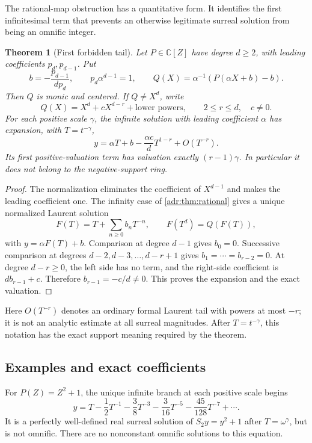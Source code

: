 \documentclass[11pt,letterpaper]{article}
\numberwithin{equation}{section}
\newtheorem{theorem}{Theorem}[section]
\theoremstyle{definition}
\theoremstyle{remark}
\newcommand{\C}{\mathbb C}
\begin{document}
The rational-map obstruction has a quantitative form. It identifies the
first infinitesimal term that prevents an otherwise legitimate surreal
solution from being an omnific integer.

\begin{theorem}[First forbidden tail]\label{adr:thm:tail}
Let $P\in\C[Z]$ have degree $d\ge2$, with leading coefficients
$p_d,p_{d-1}$. Put
\[
 b=-\frac{p_{d-1}}{d p_d},\qquad
 p_d\alpha^{d-1}=1,
 \qquad Q(X)=\alpha^{-1}(P(\alpha X+b)-b).
\]
Then $Q$ is monic and centered. If $Q\ne X^d$, write
\[
 Q(X)=X^d+cX^{d-r}+\text{lower powers},
 \qquad 2\le r\le d,\quad c\ne0.
\]
For each positive scale $\gamma$, the infinite solution with leading
coefficient $\alpha$ has expansion, with $T=t^{-\gamma}$,
\begin{equation}\label{adr:eq:tail}
 y=\alpha T+b-\frac{\alpha c}{d}T^{1-r}+O(T^{-r}).
\end{equation}
Its first positive-valuation term has valuation exactly $(r-1)\gamma$.
In particular it does not belong to the negative-support ring.
\end{theorem}
\begin{proof}
The normalization eliminates the coefficient of $X^{d-1}$ and makes the
leading coefficient one. The infinity case of \cref{adr:thm:rational}
gives a unique normalized Laurent solution
\[
 F(T)=T+\sum_{n\ge0}b_nT^{-n},\qquad F(T^d)=Q(F(T)),
\]
with $y=\alpha F(T)+b$. Comparison at degree $d-1$ gives $b_0=0$.
Successive comparison at degrees $d-2,d-3,\ldots,d-r+1$ gives
$b_1=\cdots=b_{r-2}=0$. At degree $d-r\ge0$, the left side has no
term, and the right-side coefficient is $d b_{r-1}+c$. Therefore
$b_{r-1}=-c/d\ne0$. This proves the expansion and the exact valuation.
\end{proof}

Here $O(T^{-r})$ denotes an ordinary formal Laurent tail with powers at
most $-r$; it is not an analytic estimate at all surreal magnitudes.
After $T=t^{-\gamma}$, this notation has the exact support meaning
required by the theorem.

\subsection{Examples and exact coefficients}

For $P(Z)=Z^2+1$, the unique infinite branch at each positive scale begins
\begin{equation}\label{adr:eq:quadratic-example}
 y=T-\frac12T^{-1}-\frac38T^{-3}-\frac3{16}T^{-5}
      -\frac{45}{128}T^{-7}+\cdots.
\end{equation}
It is a perfectly well-defined real surreal solution of
$S_2y=y^2+1$ after $T=\omega^\gamma$, but is not omnific.
There are no nonconstant omnific solutions to this equation.
\end{document}
